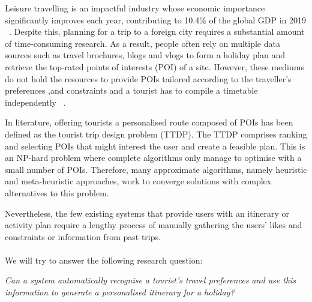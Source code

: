 
Leisure travelling is an impactful industry
whose economic importance significantly improves each
year, contributing to 10.4\% of the global GDP in 2019
~\cite{wttc2018travel}. Despite this, planning for a trip to a
foreign city requires a substantial amount of
time-consuming research. As a result, people often
rely on multiple data sources such as travel
brochures, blogs and vlogs to form a holiday plan and
retrieve the top-rated points of interests (POI) of a site. 
However,  these mediums do not hold the
resources to provide POIs tailored according to the traveller's preferences ,and
constraints and a tourist has to compile a timetable
independently
~\cite{DeChoudhury2010}. 

In literature, offering tourists a personalised route
composed of POIs has been defined as the tourist trip
design problem (TTDP). The TTDP comprises ranking
and selecting POIs that might interest the user and
create a feasible plan. 
This is an NP-hard problem where complete 
algorithms only manage to optimise with a small number
of POIs. Therefore, many approximate algorithms,
namely heuristic and meta-heuristic approaches, work
to converge solutions with complex alternatives to
this problem.

Nevertheless, the few existing systems that provide
users with an itinerary or activity plan require a lengthy
process of manually gathering the users' likes and
constraints or information from past trips. 
\\
\\

\noindent  We will try to answer the following research question:


\begin{center}

\textit{Can a system automatically recognise a tourist's travel
preferences and use this information to generate a personalised itinerary
for a holiday?}

\end{center}


